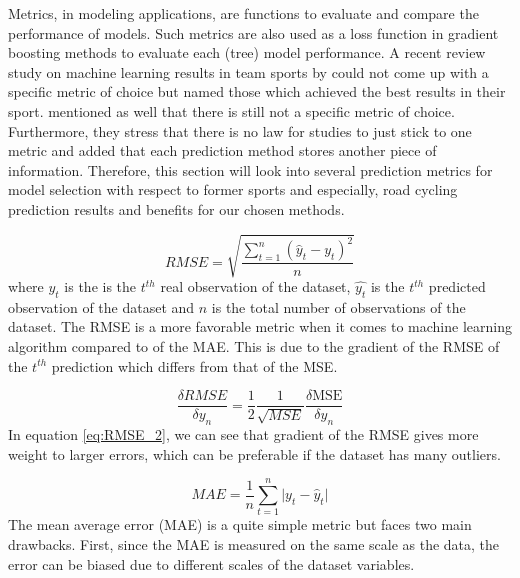 \documentclass[12pt,a4paper]{article}
\begin{document}
Metrics, in modeling applications, are functions to evaluate and compare the performance of models. Such metrics are also used as a loss function in gradient boosting methods to evaluate each (tree) model performance. A recent review study on machine learning results in team sports by \textcite{Claudino2019a} could not come up with a specific metric of choice but named those which achieved the best results in their sport. \textcite{Tofallis2015} mentioned as well that there is still not a specific metric of choice. Furthermore, they stress that there is no law for studies to just stick to one metric and added that each prediction method stores another piece of information. Therefore, this section will look into several prediction metrics for model selection with respect to former sports and especially, road cycling prediction results and benefits for our chosen methods.

\begin{equation}
RMSE = \sqrt{\dfrac{\sum^{n}_{t=1} (\hat{y}_t-y_t)^2}{n}} 
\end{equation}
where \(y_t\) is the is the \(t^{th}\) real observation of the dataset, \(\hat{y_t}\) is the \(t^{th}\) predicted observation of the dataset
and \(n\) is the total number of observations of the dataset. The RMSE is a more favorable metric when it comes to machine learning algorithm compared to of the MAE. This is due to the gradient of the RMSE of the \(t^{th}\) prediction which differs from that of the MSE.

\begin{equation}
\dfrac{\delta RMSE}{\delta y_n}=\dfrac{1}{2}\dfrac{1}{\sqrt{MSE}}\dfrac{\delta\text{MSE}}{\delta y_n} 
\label{eq:RMSE_2}
\end{equation}
In equation \ref{eq:RMSE_2}, we can see that gradient of the RMSE gives more weight to larger errors, which can be preferable if the dataset has many outliers.

\begin{equation}
MAE = \dfrac{1}{n}\sum^n_{t=1}\big|y_t-\hat{y}_t\big|
\end{equation}
The mean average error (MAE) is a quite simple metric but faces two main drawbacks. First, since the MAE is measured on the same scale as the data, the error can be biased due to different scales of the dataset variables.
\end{document}
